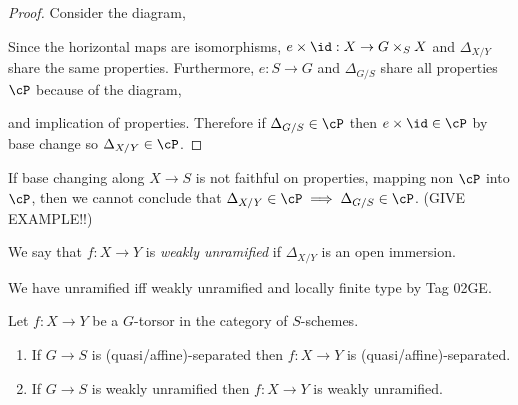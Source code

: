 \documentclass[12pt]{article}
\begin{document}
\begin{proof}
Consider the diagram,
\begin{center}
\end{center}
Since the horizontal maps are isomorphisms, $e \times \id : X \to G \times_S X$ and $\Delta_{X/Y}$ share the same properties. Furthermore, $e : S \to G$ and $\Delta_{G/S}$ share all properties $\cP$ because of the diagram,
\begin{center}
\end{center}
and implication of properties. Therefore if $\Delta_{G/S} \in \cP$ then $e \times \id \in \cP$ by base change so $\Delta_{X/Y} \in \cP$.
\end{proof}

\begin{rmk}
If base changing along $X \to S$ is not faithful on properties, mapping non $\cP$ into $\cP$, then we cannot conclude that $\Delta_{X/Y} \in \cP \implies \Delta_{G/S} \in \cP$. (GIVE EXAMPLE!!) 
\end{rmk}

\begin{defn}
We say that $f : X \to Y$ is \textit{weakly unramified} if $\Delta_{X/Y}$ is an open immersion.
\end{defn}

\begin{rmk}
We have unramified iff weakly unramified and locally finite type by Tag 02GE.
\end{rmk}

\begin{cor}
Let $f : X \to Y$ be a $G$-torsor in the category of $S$-schemes.
\begin{enumerate}
\item If $G \to S$ is (quasi/affine)-separated then $f : X \to Y$ is (quasi/affine)-separated.
\item If $G \to S$ is weakly unramified then $f : X \to Y$ is weakly unramified.
\end{enumerate}
\end{cor}
\end{document}
